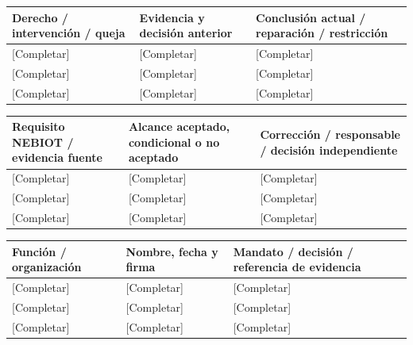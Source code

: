 {\sffamily\fontsize{8.3}{10.3}\selectfont\begin{longtable}{@{}P{54.83mm} P{54.83mm} P{54.83mm}@{}}
\toprule
\textbf{Derecho / intervención / queja} & \textbf{Evidencia y decisión anterior} & \textbf{Conclusión actual / reparación / restricción}\\\midrule\endhead
\rule{0pt}{8mm}[Completar] & [Completar] & [Completar]\\\hline
\rule{0pt}{8mm}[Completar] & [Completar] & [Completar]\\\hline
\rule{0pt}{8mm}[Completar] & [Completar] & [Completar]\\\hline
\end{longtable}}
{\sffamily\fontsize{8.3}{10.3}\selectfont\begin{longtable}{@{}P{54.83mm} P{54.83mm} P{54.83mm}@{}}
\toprule
\textbf{Requisito NEBIOT / evidencia fuente} & \textbf{Alcance aceptado, condicional o no aceptado} & \textbf{Corrección / responsable / decisión independiente}\\\midrule\endhead
\rule{0pt}{8mm}[Completar] & [Completar] & [Completar]\\\hline
\rule{0pt}{8mm}[Completar] & [Completar] & [Completar]\\\hline
\rule{0pt}{8mm}[Completar] & [Completar] & [Completar]\\\hline
\end{longtable}}
{\sffamily\fontsize{8.3}{10.3}\selectfont\begin{longtable}{@{}P{54.83mm} P{54.83mm} P{54.83mm}@{}}
\toprule
\textbf{Función / organización} & \textbf{Nombre, fecha y firma} & \textbf{Mandato / decisión / referencia de evidencia}\\\midrule\endhead
\rule{0pt}{8mm}[Completar] & [Completar] & [Completar]\\\hline
\rule{0pt}{8mm}[Completar] & [Completar] & [Completar]\\\hline
\rule{0pt}{8mm}[Completar] & [Completar] & [Completar]\\\hline
\end{longtable}}


